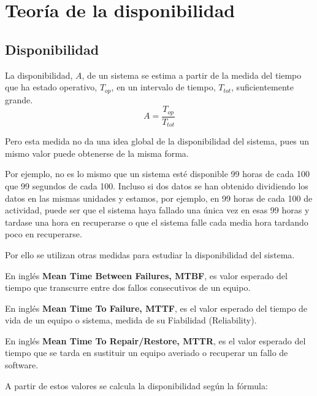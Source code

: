 \section{Teoría de la disponibilidad}
\subsection{Disponibilidad}
La disponibilidad, $A$, de un sistema se estima a partir de la medida del tiempo que ha estado operativo, $T_{op}$, en un intervalo de tiempo, $T_{tot}$, suficientemente grande.
\[A= \frac{T_{op}}{T_{tot}}\]

Pero esta medida no da una idea global de la disponibilidad del sistema, pues un mismo valor puede obtenerse de la misma forma.

Por ejemplo, no es lo mismo que un sistema esté disponible 99 horas de cada 100 que 99 segundos de cada 100. Incluso si dos datos se han obtenido dividiendo los datos en las mismas unidades y estamos, por ejemplo, en 99 horas de cada 100 de actividad, puede ser que el sistema haya fallado una única vez en esas 99 horas y tardase una hora en recuperarse o que el sistema falle cada media hora tardando poco en recuperarse.

Por ello se utilizan otras medidas para estudiar la disponibilidad del sistema.

\begin{defn}

En inglés \textbf{Mean Time Between Failures, MTBF}, es valor esperado del tiempo que transcurre entre dos fallos consecutivos de un equipo.
\end{defn}

\begin{defn}

En inglés \textbf{Mean Time To Failure, MTTF}, es el valor esperado del tiempo de vida de un equipo o sistema, medida de su Fiabilidad (Reliability).
\end{defn}

\begin{defn}

En inglés \textbf{Mean Time To Repair/Restore, MTTR}, es el valor esperado del tiempo que se tarda en sustituir un equipo averiado o recuperar un fallo de software.
\end{defn}

A partir de estos valores se calcula la disponibilidad según la fórmula:

